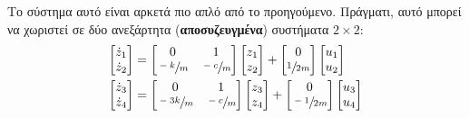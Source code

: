 \documentclass[11pt,a4paper,notitlepage,fleqn]{article}
\begin{document}
\begin{exercise}
	Το σύστημα αυτό είναι αρκετά πιο απλό από το προηγούμενο. Πράγματι,
	αυτό μπορεί να χωριστεί σε δύο ανεξάρτητα (\textbf{αποσυζευγμένα})
	συστήματα \( 2\times2 \):
	\begin{align*}
		\left[\begin{matrix}
		\dot z_1\\ \dot z_2
		\end{matrix}\right] &= \left[\begin{matrix}
		0 & 1 \\ \sfrac{-k}{m}  & \sfrac{-c}{m} 
		\end{matrix}\right]\left[\begin{matrix}
		z_1\\z_2
		\end{matrix}\right] + \left[\begin{matrix}
		0 \\ \sfrac{1}{2m} 
		\end{matrix}\right]\left[\begin{matrix}
		u_1 \\ u_2
		\end{matrix}\right] \\
		\left[\begin{matrix}
		\dot z_3\\ \dot z_4
		\end{matrix}\right] &= \left[\begin{matrix}
		0 & 1 \\ \sfrac{-3k}{m}  & \sfrac{-c}{m} 
		\end{matrix}\right]\left[\begin{matrix}
		z_3\\z_4
		\end{matrix}\right] + \left[\begin{matrix}
		0 \\ \sfrac{-1}{2m} 
		\end{matrix}\right]\left[\begin{matrix}
		u_3 \\ u_4
		\end{matrix}\right]
	\end{align*}
	

\end{exercise}
\end{document}
